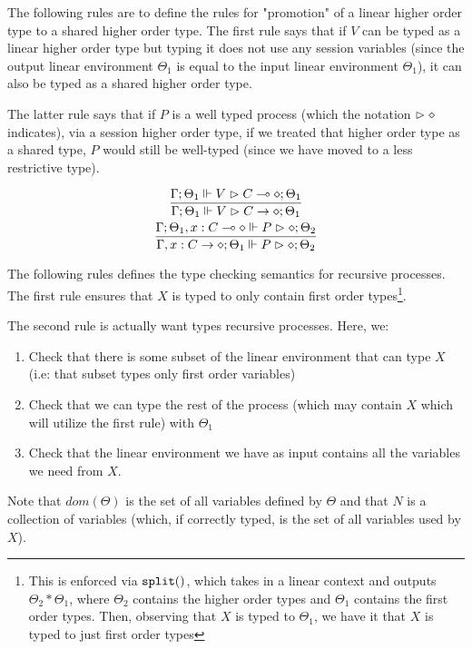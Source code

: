 The following rules are to define the rules for "promotion" of a linear higher order type to a shared higher order type. The first rule says that if $V$ can be typed as a linear higher order type but typing it does not use any session variables (since the output linear environment $\Theta_1$ is equal to the input linear environment $\Theta_1$), it can also be typed as a shared higher order type.

The latter rule says that if $P$ is a well typed process (which the notation $\vartriangleright \diamond$ indicates), via a session higher order type, if we treated that higher order type as a shared type, $P$ would still be well-typed (since we have moved to a less restrictive type).

\begin{gather*}
\frac{\Gamma ; \Theta_1 \Vdash V \vartriangleright C \multimap \diamond ; \Theta_1}{\Gamma ; \Theta_1 \Vdash V \vartriangleright C \rightarrow \diamond ; \Theta_1} \\
\frac{\Gamma ; \Theta_1, x : C \multimap \diamond \Vdash P \vartriangleright \diamond ; \Theta_2}{\Gamma, x : C \rightarrow \diamond ; \Theta_1 \Vdash P \vartriangleright \diamond ; \Theta_2}
\end{gather*}


The following rules defines the type checking semantics for recursive processes. The first rule ensures that $X$ is typed to only contain first order types\footnote{This is enforced via $\splt$, which takes in a linear context and outputs $\Theta_2 * \Theta_1$, where $\Theta_2$ contains the higher order types and $\Theta_1$ contains the first order types. Then, observing that $X$ is typed to $\Theta_1$, we have it that $X$ is typed to just first order types}.

The second rule is actually want types recursive processes. Here, we:
\begin{enumerate}
    \item Check that there is some subset of the linear environment that can type $X$ (i.e: that subset types only first order variables)
    \item Check that we can type the rest of the process (which may contain $X$ which will utilize the first rule) with $\Theta_1$
    \item Check that the linear environment we have as input contains all the variables we need from $X$.
\end{enumerate}

Note that $dom(\Theta)$ is the set of all variables defined by $\Theta$ and that $N$ is a collection of variables (which, if correctly typed, is the set of all variables used by $X$).

